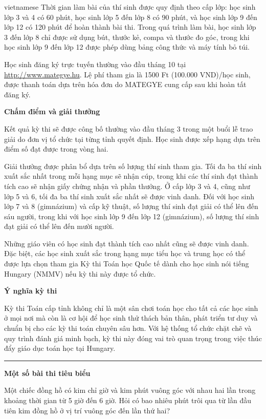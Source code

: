 \documentclass{article}
\begin{document}
\begin{otherlanguage*}{vietnamese}
Thời gian làm bài của thí sinh được quy định theo cấp lớp: học sinh lớp 3 và 4 có 60 phút,
học sinh lớp 5 đến lớp 8 có 90 phút, và học sinh lớp 9 đến lớp 12 có 120 phút để hoàn thành bài thi.
Trong quá trình làm bài, học sinh lớp 3 đến lớp 8 chỉ được sử dụng bút, thước kẻ, compa và thước đo góc,
trong khi học sinh lớp 9 đến lớp 12 được phép dùng bảng công thức và máy tính bỏ túi.

Học sinh đăng ký trực tuyến thường vào đầu tháng 10 tại \url{http://www.mategye.hu}. Lệ phí tham gia là 1500 Ft (100.000 VND)/học sinh,
được thanh toán dựa trên hóa đơn do MATEGYE cung cấp sau khi hoàn tất đăng ký.

\textbf{Chấm điểm và giải thưởng}

Kết quả kỳ thi sẽ được công bố thường vào đầu tháng 3 trong một buổi lễ trao giải do đơn vị tổ chức tại từng tỉnh quyết định.
Học sinh được xếp hạng dựa trên điểm số đạt được trong vòng hai.

Giải thưởng được phân bổ dựa trên số lượng thí sinh tham gia. Tối đa ba thí sinh xuất sắc nhất trong mỗi hạng mục sẽ nhận cúp,
trong khi các thí sinh đạt thành tích cao sẽ nhận giấy chứng nhận và phần thưởng.
Ở cấp lớp 3 và 4, cũng như lớp 5 và 6, tối đa ba thí sinh xuất sắc nhất sẽ được vinh danh.
Đối với học sinh lớp 7 và 8 (gimnázium) và cấp kỹ thuật, số lượng thí sinh đạt giải có thể lên đến sáu người,
trong khi với học sinh lớp 9 đến lớp 12 (gimnázium), số lượng thí sinh đạt giải có thể lên đến mười người.

Những giáo viên có học sinh đạt thành tích cao nhất cũng sẽ được vinh danh.
Đặc biệt, các học sinh xuất sắc trong hạng mục tiểu học và trung học
có thể được lựa chọn tham gia Kỳ thi Toán học Quốc tế dành cho học sinh nói tiếng Hungary (NMMV) nếu kỳ thi này được tổ chức.

\textbf{Ý nghĩa kỳ thi}

Kỳ thi Toán cấp tỉnh không chỉ là một sân chơi toán học cho tất cả các học sinh ở mọi nơi mà còn là cơ hội để học sinh thử thách bản thân, phát triển tư duy và chuẩn bị cho các kỳ thi toán chuyên sâu hơn.
Với hệ thống tổ chức chặt chẽ và quy trình đánh giá minh bạch, kỳ thi này đóng vai trò quan trọng trong việc thúc đẩy giáo dục toán học tại Hungary.

\bigbreak

\noindent\rule{16.5cm}{0.4pt}

\textbf{Một số bài thi tiêu biểu}

\bigbreak

\begin{problem*}
    Một chiếc đồng hồ có kim chỉ giờ và kim phút vuông góc với nhau hai lần trong khoảng thời gian từ 5 giờ đến 6 giờ.
    Hỏi có bao nhiêu phút trôi qua từ lần đầu tiên kim đồng hồ ở vị trí vuông góc đến lần thứ hai?
\end{problem*}


\end{otherlanguage*}
\end{document}
